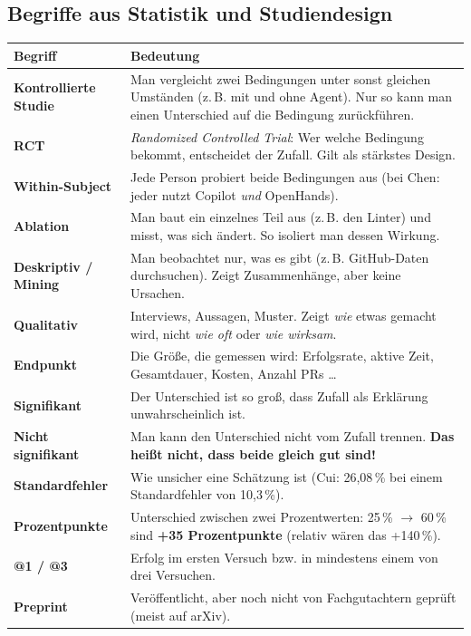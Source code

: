 \documentclass[11pt,a4paper,parskip=half]{scrartcl}
\begin{document}
\subsection{Begriffe aus Statistik und Studiendesign}
\begin{tabularx}{\textwidth}{@{}>{\bfseries}p{3.6cm}L@{}}
\toprule
Begriff & Bedeutung \\
\midrule
Kontrollierte Studie & Man vergleicht zwei Bedingungen unter sonst gleichen Umständen (z.\,B. mit und ohne Agent). Nur so kann man einen Unterschied auf die Bedingung zurückführen. \\
RCT & \emph{Randomized Controlled Trial}: Wer welche Bedingung bekommt, entscheidet der Zufall. Gilt als stärkstes Design. \\
Within-Subject & Jede Person probiert beide Bedingungen aus (bei Chen: jeder nutzt Copilot \emph{und} OpenHands). \\
Ablation & Man baut ein einzelnes Teil aus (z.\,B. den Linter) und misst, was sich ändert. So isoliert man dessen Wirkung. \\
Deskriptiv / Mining & Man beobachtet nur, was es gibt (z.\,B. GitHub-Daten durchsuchen). Zeigt Zusammenhänge, aber keine Ursachen. \\
Qualitativ & Interviews, Aussagen, Muster. Zeigt \emph{wie} etwas gemacht wird, nicht \emph{wie oft} oder \emph{wie wirksam}. \\
Endpunkt & Die Größe, die gemessen wird: Erfolgsrate, aktive Zeit, Gesamtdauer, Kosten, Anzahl PRs \ldots \\
Signifikant & Der Unterschied ist so groß, dass Zufall als Erklärung unwahrscheinlich ist. \\
Nicht signifikant & Man kann den Unterschied nicht vom Zufall trennen. \textbf{Das heißt nicht, dass beide gleich gut sind!} \\
Standardfehler & Wie unsicher eine Schätzung ist (Cui: 26,08\,\% bei einem Standardfehler von 10,3\,\%). \\
Prozentpunkte & Unterschied zwischen zwei Prozentwerten: 25\,\% \(\rightarrow\) 60\,\% sind \textbf{+35 Prozentpunkte} (relativ wären das +140\,\%). \\
@1 / @3 & Erfolg im ersten Versuch bzw. in mindestens einem von drei Versuchen. \\
Preprint & Veröffentlicht, aber noch nicht von Fachgutachtern geprüft (meist auf arXiv). \\
\bottomrule
\end{tabularx}
\end{document}
